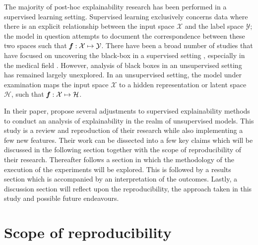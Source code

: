 The majority of post-hoc explainability research has been performed in a supervised learning setting. %
Supervised learning exclusively concerns data where there is an explicit relationship between the input space $\mathcal{X}$ and the label space $\mathcal{Y}$; the model in question attempts to document the correspondence between these two spaces such that $\textbf{\textit{f}}: \mathcal{X} \mapsto \mathcal{Y}$. There have been a broad number of studies that have focused on uncovering the black-box in a supervised setting \cite{ModelExplainability, ConceptActivationVectors}, especially in the medical field \cite{ching2018opportunities, tjoa2020survey}.
However, analysis of black boxes in an unsupervised setting has remained largely unexplored. In an unsupervised setting, the model under examination maps the input space $\mathcal{X}$ to a hidden representation or latent space $\mathcal{H}$, such that $\textbf{\textit{f}}: \mathcal{X} \mapsto \mathcal{H}$. 

In their paper, \citet{LabelFreeExplainability} propose several adjustments to supervised explainability methods to conduct an analysis of explainability in the realm of unsupervised models. This study is a review and reproduction of their research while also implementing a few new features. Their work can be dissected into a few key claims which will be discussed in the following section together with the scope of reproducibility of their research. Thereafter follows a section in which the methodology of the execution of the experiments will be explored. This is followed by a results section which is accompanied by an interpretation of the outcomes. Lastly, a discussion section will reflect upon the reproducibility, the approach taken in this study and possible future endeavours.

\section{Scope of reproducibility}
\label{sec:claims}



